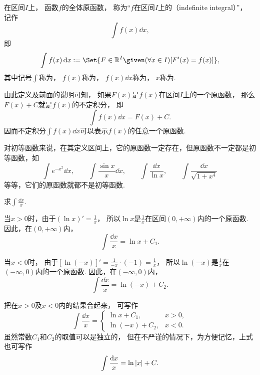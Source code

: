 \begin{definition}
在区间\(I\)上，
函数\(f\)的全体原函数，
称为“\(f\)在区间\(I\)上的（indefinite integral）”，
记作\[
	\int f(x) \dd{x},
\]
即\[
	\int f(x) \dd{x}
	\defeq
	\Set{ F \in \mathbb{R}^I \given (\forall x \in I)[F'(x) = f(x)] },
\]
其中记号\(\int\)称为，
\(f(x)\)称为，
\(f(x) \dd{x}\)称为，
\(x\)称为.
\end{definition}
由此定义及前面的说明可知，
如果\(F(x)\)是\(f(x)\)在区间\(I\)上的一个原函数，
那么\(F(x) + C\)就是\(f(x)\)的不定积分，
即\[
	\int f(x) \dd{x} = F(x) + C.
\]
因而不定积分\(\int f(x) \dd{x}\)可以表示\(f(x)\)的任意一个原函数.

对初等函数来说，在其定义区间上，它的原函数一定存在，但原函数不一定都是初等函数，如\[
	\int e^{-x^2} \dd{x}, \qquad
	\int \frac{\sin x}{x} \dd{x}, \qquad
	\int \frac{\dd{x}}{\ln{x}}, \qquad
	\int \frac{\dd{x}}{\sqrt{1+x^4}}
\]
等等，它们的原函数就都不是初等函数.

\begin{example}
求\(\int \frac{\dd{x}}{x}\).
\begin{solution}
当\(x > 0\)时，由于\((\ln x)' = \frac{1}{x}\)，
所以\(\ln x\)是\(\frac{1}{x}\)在区间\((0,+\infty)\)内的一个原函数.
因此，在\((0,+\infty)\)内，\[
	\int \frac{\dd{x}}{x} = \ln x + C_1.
\]

当\(x < 0\)时，
由于\([\ln(-x)]' = \frac{1}{-x} \cdot (-1) = \frac{1}{x}\)，
所以\(\ln(-x)\)是\(\frac{1}{x}\)在\((-\infty,0)\)内的一个原函数.
因此，在\((-\infty,0)\)内，\[
	\int \frac{\dd{x}}{x} = \ln(-x) + C_2.
\]

把在\(x > 0\)及\(x < 0\)内的结果合起来，
可写作\begin{equation}
	\int \frac{\dd{x}}{x} = \left\{ \begin{array}{lc}
		\ln x + C_1, & x>0, \\
		\ln(-x) + C_2, & x<0.
	\end{array} \right.
\end{equation}
虽然常数\(C_1\)和\(C_2\)的取值可以是独立的，
但在不严谨的情况下，为方便记忆，上式也可写作\begin{equation}
	\int \frac{\dd{x}}{x} = \ln\abs{x} + C.
\end{equation}
\end{solution}
\end{example}

